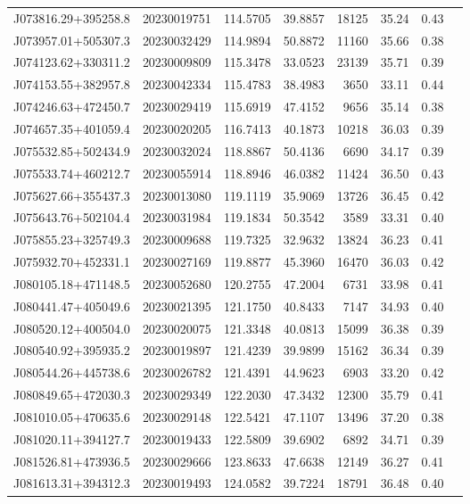 \documentclass{article}
\begin{document}
\begin {longtable}{|l|l|r|r|r|r|r|l|}
 J073816.29+395258.8&  20230019751&  114.5705&   39.8857& 18125& 35.24& 0.43&\\
 J073957.01+505307.3&  20230032429&  114.9894&   50.8872& 11160& 35.66& 0.38&\\
 J074123.62+330311.2&  20230009809&  115.3478&   33.0523& 23139& 35.71& 0.39&\\
 J074153.55+382957.8&  20230042334&  115.4783&   38.4983&  3650& 33.11& 0.44&\\
 J074246.63+472450.7&  20230029419&  115.6919&   47.4152&  9656& 35.14& 0.38&\\
 J074657.35+401059.4&  20230020205&  116.7413&   40.1873& 10218& 36.03& 0.39&\\
 J075532.85+502434.9&  20230032024&  118.8867&   50.4136&  6690& 34.17& 0.39&\\
 J075533.74+460212.7&  20230055914&  118.8946&   46.0382& 11424& 36.50& 0.43&\\
 J075627.66+355437.3&  20230013080&  119.1119&   35.9069& 13726& 36.45& 0.42&\\
 J075643.76+502104.4&  20230031984&  119.1834&   50.3542&  3589& 33.31& 0.40&\\
 J075855.23+325749.3&  20230009688&  119.7325&   32.9632& 13824& 36.23& 0.41&\\
 J075932.70+452331.1&  20230027169&  119.8877&   45.3960& 16470& 36.03& 0.42&\\
 J080105.18+471148.5&  20230052680&  120.2755&   47.2004&  6731& 33.98& 0.41&\\
 J080441.47+405049.6&  20230021395&  121.1750&   40.8433&  7147& 34.93& 0.40&\\
 J080520.12+400504.0&  20230020075&  121.3348&   40.0813& 15099& 36.38& 0.39&\\
 J080540.92+395935.2&  20230019897&  121.4239&   39.9899& 15162& 36.34& 0.39&\\
 J080544.26+445738.6&  20230026782&  121.4391&   44.9623&  6903& 33.20& 0.42&\\
 J080849.65+472030.3&  20230029349&  122.2030&   47.3432& 12300& 35.79& 0.41&\\
 J081010.05+470635.6&  20230029148&  122.5421&   47.1107& 13496& 37.20& 0.38&\\
 J081020.11+394127.7&  20230019433&  122.5809&   39.6902&  6892& 34.71& 0.39&\\
 J081526.81+473936.5&  20230029666&  123.8633&   47.6638& 12149& 36.27& 0.41&\\
 J081613.31+394312.3&  20230019493&  124.0582&   39.7224& 18791& 36.48& 0.40&\\

\end{longtable}
\end{document}
